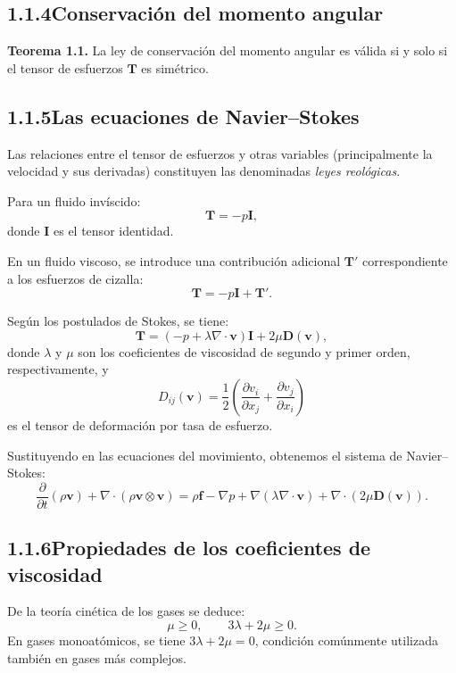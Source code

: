 \documentclass[12pt,a4paper]{article}
\begin{document}
\subsection*{1.1.4\quad Conservación del momento angular}

\textbf{Teorema 1.1.} La ley de conservación del momento angular es válida si y solo si el tensor de esfuerzos $\mathbf{T}$ es simétrico.

\subsection*{1.1.5\quad Las ecuaciones de Navier--Stokes}

Las relaciones entre el tensor de esfuerzos y otras variables (principalmente la velocidad y sus derivadas) constituyen las denominadas \textit{leyes reológicas}.

Para un fluido invíscido:
\begin{equation}
\mathbf{T} = -p \mathbf{I},
\end{equation}
donde $\mathbf{I}$ es el tensor identidad.

En un fluido viscoso, se introduce una contribución adicional $\mathbf{T}'$ correspondiente a los esfuerzos de cizalla:
\begin{equation}
\mathbf{T} = -p \mathbf{I} + \mathbf{T}'.
\end{equation}

Según los postulados de Stokes, se tiene:
\begin{equation}
\mathbf{T} = (-p + \lambda \nabla \cdot \mathbf{v}) \mathbf{I} + 2\mu \mathbf{D}(\mathbf{v}),
\end{equation}
donde $\lambda$ y $\mu$ son los coeficientes de viscosidad de segundo y primer orden, respectivamente, y
\begin{equation}
D_{ij}(\mathbf{v}) = \frac{1}{2} \left( \frac{\partial v_i}{\partial x_j} + \frac{\partial v_j}{\partial x_i} \right)
\end{equation}
es el tensor de deformación por tasa de esfuerzo.

Sustituyendo en las ecuaciones del movimiento, obtenemos el sistema de Navier--Stokes:
\begin{equation}
\frac{\partial}{\partial t}(\rho \mathbf{v}) + \nabla \cdot (\rho \mathbf{v} \otimes \mathbf{v}) = \rho \mathbf{f} - \nabla p + \nabla (\lambda \nabla \cdot \mathbf{v}) + \nabla \cdot (2\mu \mathbf{D}(\mathbf{v})).
\end{equation}

\subsection*{1.1.6\quad Propiedades de los coeficientes de viscosidad}

De la teoría cinética de los gases se deduce:
\begin{equation}
\mu \geq 0, \qquad 3\lambda + 2\mu \geq 0.
\end{equation}
En gases monoatómicos, se tiene $3\lambda + 2\mu = 0$, condición comúnmente utilizada también en gases más complejos.
\end{document}

